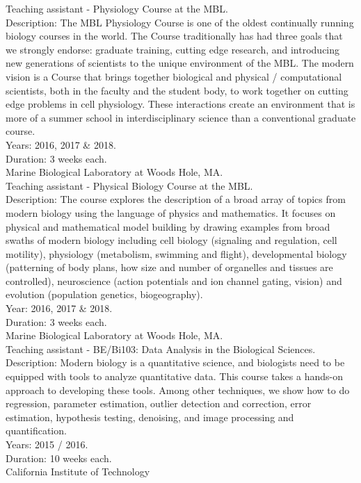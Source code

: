 \documentclass[]{friggeri-cv}
\begin{document}
Teaching assistant - Physiology Course at the MBL.\\
Description: The MBL Physiology Course is one of the oldest continually running biology courses in the world. The Course traditionally has had three goals that we strongly endorse: graduate training, cutting edge research, and introducing new generations of scientists to the unique environment of the MBL. The modern vision is a Course that brings together biological and physical / computational scientists, both in the faculty and the student body, to work together on cutting edge problems in cell physiology. These interactions create an environment that is more of a summer school in interdisciplinary science than a conventional graduate course.\\
Years: 2016, 2017 \& 2018.\\
Duration: 3 weeks each.\\
{Marine Biological Laboratory at Woods Hole, MA.}\\

Teaching assistant - Physical Biology Course at the MBL.\\
Description: The course explores the description of a broad array of topics from modern biology using the language of physics and mathematics. It focuses on physical and mathematical model building by drawing examples from broad swaths of modern biology including cell biology (signaling and regulation, cell motility), physiology (metabolism, swimming and flight), developmental biology (patterning of body plans, how size and number of organelles and tissues are controlled), neuroscience (action potentials and ion channel gating, vision) and evolution (population genetics, biogeography).\\
Year: 2016, 2017 \& 2018.\\
Duration: 3 weeks each.\\
{Marine Biological Laboratory at Woods Hole, MA.}\\

Teaching assistant - BE/Bi103: Data Analysis in the Biological Sciences.\\
Description: Modern biology is a quantitative science, and biologists need to be equipped with tools to analyze quantitative data. This course takes a hands-on approach to developing these tools. Among other techniques, we show how to do regression, parameter estimation, outlier detection and correction, error estimation, hypothesis testing, denoising, and image processing and quantification.\\
Years: 2015 / 2016.\\
Duration: 10 weeks each.\\
{California Institute of Technology}\\
\end{document}
